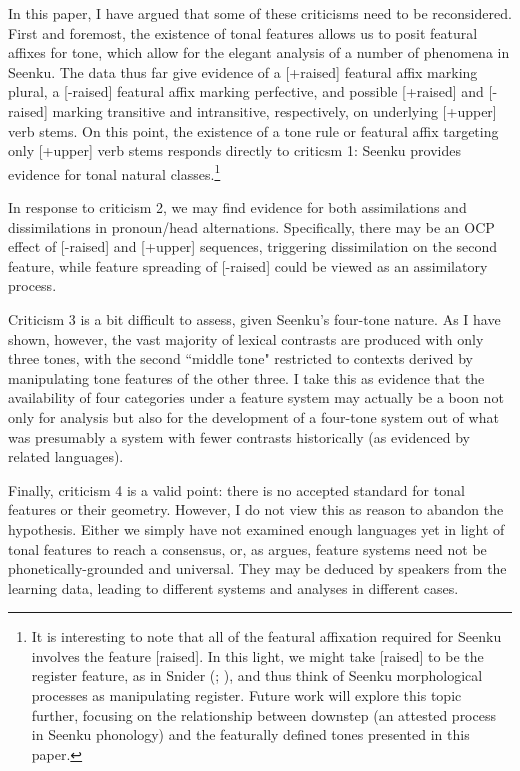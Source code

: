 \documentclass[output=paper]{langsci/langscibook}
\begin{document}
In this paper, I have argued that some of these criticisms need to be reconsidered. First and foremost, the existence of tonal features allows us to posit featural affixes for tone, which allow for the elegant analysis of a number of phenomena in Seenku. The data thus far give evidence of a {[+raised]} featural affix marking plural, a {[-raised]} featural affix marking perfective, and possible [+raised] and [-raised] marking transitive and intransitive, respectively, on underlying [+upper] verb stems. On this point, the existence of a tone rule or featural affix targeting only [+upper] verb stems responds directly to criticsm 1: Seenku provides evidence for tonal natural classes.\footnote{It is interesting to note that all of the featural affixation required for Seenku involves the feature [raised]. In this light, we might take [raised] to be the register feature, as in Snider (\citeyear{Snider90}; \citeyear{Snider98}), and thus think of Seenku morphological processes as manipulating register. Future work will explore this topic further, focusing on the relationship between downstep (an attested process in Seenku phonology) and the featurally defined tones presented in this paper.}

In response to criticism 2, we may find evidence for both assimilations and dissimilations in pronoun/head alternations. Specifically, there may be an OCP effect of [-raised] and [+upper] sequences, triggering dissimilation on the second feature, while feature spreading of [-raised] could be viewed as an assimilatory process.

Criticism 3 is a bit difficult to assess, given Seenku's four-tone nature. As I have shown, however, the vast majority of lexical contrasts are produced with only three tones, with the second ``middle tone" restricted to contexts derived by manipulating tone features of the other three. I take this as evidence that the availability of four categories under a feature system may actually be a boon not only for analysis but also for the development of a four-tone system out of what was presumably a system with fewer contrasts historically (as evidenced by related  languages).

Finally, criticism 4 is a valid point: there is no accepted standard for tonal features or their geometry. However, I do not view this as reason to abandon the hypothesis. Either we simply have not examined enough languages yet in light of tonal features to reach a consensus, or, as \citet{Odden10} argues, feature systems need not be phonetically-grounded and universal. They may be deduced by speakers from the learning data, leading to different systems and analyses in different cases. 
\end{document}
